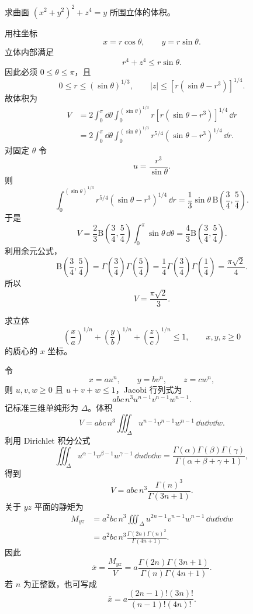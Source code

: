 \begin{xreferenceproblem}[8]
求曲面 $(x^2+y^2)^2+z^4=y$ 所围立体的体积。
\end{xreferenceproblem}
\begin{xsolution}
用柱坐标
\[
x=r\cos\theta,\qquad y=r\sin\theta.
\]
立体内部满足
\[
r^4+z^4\leqslant r\sin\theta.
\]
因此必须 $0\leqslant\theta\leqslant\pi$，且
\[
0\leqslant r\leqslant(\sin\theta)^{1/3},
\qquad
|z|\leqslant[r(\sin\theta-r^3)]^{1/4}.
\]
故体积为
\[
\begin{aligned}
V
&=2\int_0^\pi\dd\theta
\int_0^{(\sin\theta)^{1/3}}
r[r(\sin\theta-r^3)]^{1/4}\,\dd r\\
&=2\int_0^\pi\dd\theta
\int_0^{(\sin\theta)^{1/3}}
r^{5/4}(\sin\theta-r^3)^{1/4}\,\dd r.
\end{aligned}
\]
对固定 $\theta$ 令
\[
u=\frac{r^3}{\sin\theta}.
\]
则
\[
\int_0^{(\sin\theta)^{1/3}}
r^{5/4}(\sin\theta-r^3)^{1/4}\,\dd r
=\frac13\sin\theta\,
\mathrm{B}\left(\frac34,\frac54\right).
\]
于是
\[
V=\frac23\mathrm{B}\left(\frac34,\frac54\right)
\int_0^\pi\sin\theta\,\dd\theta
=\frac43\mathrm{B}\left(\frac34,\frac54\right).
\]
利用余元公式，
\[
\mathrm{B}\left(\frac34,\frac54\right)
=\Gamma\left(\frac34\right)\Gamma\left(\frac54\right)
=\frac14\Gamma\left(\frac34\right)\Gamma\left(\frac14\right)
=\frac{\pi\sqrt2}{4}.
\]
所以
\[
\boxed{V=\frac{\pi\sqrt2}{3}}.
\]
\end{xsolution}


\begin{xreferenceproblem}[9]
求立体
  \[
    \left(\frac xa\right)^{1/n}+\left(\frac yb\right)^{1/n}+\left(\frac zc\right)^{1/n}\leqslant1,
    \qquad x,y,z\geqslant0
  \]
  的质心的 $x$ 坐标。
\end{xreferenceproblem}
\begin{xsolution}
令
\[
x=au^n,\qquad y=bv^n,\qquad z=cw^n,
\]
则 $u,v,w\geqslant0$ 且 $u+v+w\leqslant1$，Jacobi 行列式为
\[
abc\,n^3u^{n-1}v^{n-1}w^{n-1}.
\]
记标准三维单纯形为 $\Delta$。体积
\[
V=abc\,n^3\iiint_\Delta
u^{n-1}v^{n-1}w^{n-1}\,\dd u\dd v\dd w.
\]
利用 Dirichlet 积分公式
\[
\iiint_\Delta
u^{\alpha-1}v^{\beta-1}w^{\gamma-1}\,\dd u\dd v\dd w
=\frac{\Gamma(\alpha)\Gamma(\beta)\Gamma(\gamma)}
{\Gamma(\alpha+\beta+\gamma+1)},
\]
得到
\[
V=abc\,n^3\frac{\Gamma(n)^3}{\Gamma(3n+1)}.
\]
关于 $yz$ 平面的静矩为
\[
\begin{aligned}
M_{yz}
&=a^2bc\,n^3\iiint_\Delta
u^{2n-1}v^{n-1}w^{n-1}\,\dd u\dd v\dd w\\
&=a^2bc\,n^3
\frac{\Gamma(2n)\Gamma(n)^2}{\Gamma(4n+1)}.
\end{aligned}
\]
因此
\[
\boxed{
\bar x=\frac{M_{yz}}V
=a\frac{\Gamma(2n)\Gamma(3n+1)}
{\Gamma(n)\Gamma(4n+1)}.}
\]
若 $n$ 为正整数，也可写成
\[
\boxed{
\bar x
=a\frac{(2n-1)!(3n)!}{(n-1)!(4n)!}.}
\]
\end{xsolution}


